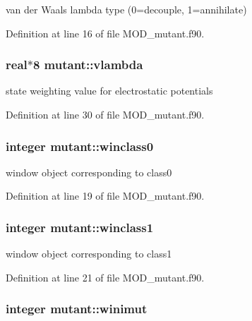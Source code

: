 van der Waals lambda type (0=decouple, 1=annihilate) 



Definition at line 16 of file M\-O\-D\-\_\-mutant.\-f90.

\hypertarget{classmutant_a36e3043de18b146a6010b9a3fbf02136}{
\subsubsection[{vlambda}]{\setlength{\rightskip}{0pt plus 5cm}real$\ast$8 mutant\-::vlambda}}\label{classmutant_a36e3043de18b146a6010b9a3fbf02136}


state weighting value for electrostatic potentials 



Definition at line 30 of file M\-O\-D\-\_\-mutant.\-f90.

\hypertarget{classmutant_aea9b816b3d0450deccd506db35f6824a}{
\subsubsection[{winclass0}]{\setlength{\rightskip}{0pt plus 5cm}integer mutant\-::winclass0}}\label{classmutant_aea9b816b3d0450deccd506db35f6824a}


window object corresponding to class0 



Definition at line 19 of file M\-O\-D\-\_\-mutant.\-f90.

\hypertarget{classmutant_af2055950a249a214a70d10531d910860}{
\subsubsection[{winclass1}]{\setlength{\rightskip}{0pt plus 5cm}integer mutant\-::winclass1}}\label{classmutant_af2055950a249a214a70d10531d910860}


window object corresponding to class1 



Definition at line 21 of file M\-O\-D\-\_\-mutant.\-f90.

\hypertarget{classmutant_a01da112336651cd662fc2199857d9a2f}{
\subsubsection[{winimut}]{\setlength{\rightskip}{0pt plus 5cm}integer mutant\-::winimut}}\label{classmutant_a01da112336651cd662fc2199857d9a2f}


